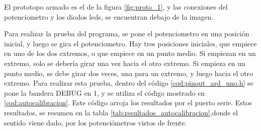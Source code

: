 El prototopo armado es el de la figura \ref{fig:proto_1}, y las conexiones del potenciometro y los diodos leds, se encuentran debajo de la imagen.  
%

Para realizar la prueba del programa, se pone el potenciometro en una posición inicial, y luego se gira el potenciometro. Hay tres posiciones iniciales, que empiece en uno de los dos extremos, o que empiece en un punto medio. Si empiezan en un extremo, solo se debería girar una vez hacia el otro extremo. Si empieza en un punto medio, se debe girar dos veces, una para un extremo, y luego hacia el otro extremo. Para realizar esta prueba, dentro del código \ref{cod:pinout_ard_uno.h} se pone la bandera DEBUG en 1, y se utiliza el código mostrado en \ref{cod:autocalibracion}. Este código arroja los resultados por el puerto serie. Estos resultados, se resumen en la tabla \ref{tab:resultados_autocalibracion},donde el sentido viene dado, por los potenciómetros vistos de frente.   

